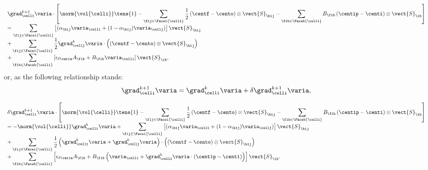 \begin{equation}\label{eq:gradrc_recontruit_comp2}
\begin{array}{ l}
\displaystyle
\grad_{\celli}^{k+1} \varia \cdot \left[\norm{\vol{\celli}} \tens{1} -
\sum\limits_{ \fij \in \Facei{\celli}} \frac{1}{2}  \left(\centf - \cento\right) \otimes \vect{S}_{\bij} -
\sum\limits_{ \fib \in \Faceb{\celli}} B_{\fib} \left(\centip - \centi\right)  \otimes \vect{S}_{\ib}  \right]
\\
  =
\displaystyle
\sum\limits_{\fij \in \Facei{\celli}}\left[
(\alpha_{\bij} \varia_\celli + (1 - \alpha_{\bij}) \varia_{\cellj})\right] \vect{S}_{\bij} \\
+
\displaystyle
\sum\limits_{\fij \in \Facei{\celli}} \frac{1}{2} \grad_{\cellj}^k \varia \cdot \left( \left(\centf - \cento\right) \otimes \vect{S}_{\bij} \right) \\
+
\displaystyle
\sum\limits_{\fib \in \Faceb{\celli}}\left[ \epsilon_{\delta \varia} A_{\fib} + B_{\fib} \varia_{\celli} \right] \vect{S}_{\ib},
\end{array}
\end{equation}
%
or, as the following relationship stands:
\begin{equation*}
 \grad_\celli^{k+1} \varia = \grad_{\celli}^k \varia+ \delta \grad_{\celli}^{k+1} \varia ,
\end{equation*}

\begin{equation}\label{eq:gradrc_recontruit_increment}
\begin{array}{l}
\displaystyle
\delta \grad_{\celli}^{k+1} \varia \cdot \left[\norm{\vol{\celli}} \tens{1} -
\sum\limits_{ \fij \in \Facei{\celli}} \frac{1}{2}  \left(\centf - \cento\right) \otimes \vect{S}_{\bij} -
\sum\limits_{ \fib \in \Faceb{\celli}} B_{\fib}  \left(\centip - \centi\right)  \otimes \vect{S}_{\ib}  \right]
\\=
\displaystyle
 -\norm{\vol{\celli}}  \grad_{\celli}^{k} \varia +
\sum\limits_{\fij \in \Facei{\celli}}\left[
(\alpha_{\bij} \varia_{\celli} + (1 - \alpha_{\bij}) \varia_{\cellj})\right] \vect{S}_{\bij} \\
+
\displaystyle
\sum\limits_{\fij \in \Facei{\celli}} \frac{1}{2}
\left(\grad_{\celli}^k \varia + \grad_{\cellj}^k \varia \right) \cdot \left( \left(\centf - \cento\right) \otimes \vect{S}_{\bij} \right) \\
+
\displaystyle
\sum\limits_{\fib \in \Faceb{\celli}}\left[ \epsilon_{\delta \varia} A_{\fib}
            + B_{\fib} \left( \varia_{\celli} + \grad_{\celli}^k \varia \cdot \left(\centip - \centi\right) \right) \right] \vect{S}_{\ib}.
\end{array}
\end{equation}


